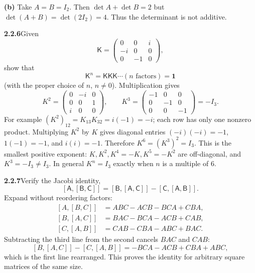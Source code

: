\textbf{(b)} Take $A=B=I_2$. Then $\det A+\det B=2$ but
$\det(A+B)=\det(2I_2)=4$. Thus the determinant is not additive.

\par\bigskip
\noindent\textbf{2.2.6}\quad Given
\[
\mathsf{K}=\begin{pmatrix}0&0&i\\-i&0&0\\0&-1&0\end{pmatrix},
\]
show that
\[
\mathsf{K}^{n}=\mathsf{KKK}\cdots(n\text{ factors})=\mathbf{1}
\]
(with the proper choice of $n$, $n\neq0$).
\solution
Multiplication gives
\[
K^2=\begin{pmatrix}0&-i&0\\0&0&1\\i&0&0\end{pmatrix},
\qquad K^3=\begin{pmatrix}-1&0&0\\0&-1&0\\0&0&-1\end{pmatrix}=-I_3.
\]
For example $(K^2)_{12}=K_{13}K_{32}=i(-1)=-i$; each row has
only one nonzero product. Multiplying $K^2$ by $K$ gives diagonal
entries $(-i)(-i)=-1$, $1(-1)=-1$, and $i(i)=-1$.
Therefore $\boxed{K^6=(K^3)^2=I_3}$.
This is the smallest positive exponent: $K,K^2,K^4=-K,K^5=-K^2$
are off-diagonal, and $K^3=-I_3\ne I_3$.
In general $K^n=I_3$ exactly when $n$ is a multiple of $6$.

\par\bigskip
\noindent\textbf{2.2.7}\quad Verify the Jacobi identity,
\[
[\mathsf{A},[\mathsf{B},\mathsf{C}]]
=[\mathsf{B},[\mathsf{A},\mathsf{C}]]-[\mathsf{C},[\mathsf{A},\mathsf{B}]].
\]
\solution
Expand without reordering factors:
\[
\begin{aligned}
{}[A,[B,C]]&=ABC-ACB-BCA+CBA,\\
[B,[A,C]]&=BAC-BCA-ACB+CAB,\\
[C,[A,B]]&=CAB-CBA-ABC+BAC.
\end{aligned}
\]
Subtracting the third line from the second cancels $BAC$ and $CAB$:
\[
[B,[A,C]]-[C,[A,B]]=-BCA-ACB+CBA+ABC,
\]
which is the first line rearranged. This proves the identity for
arbitrary square matrices of the same size.

